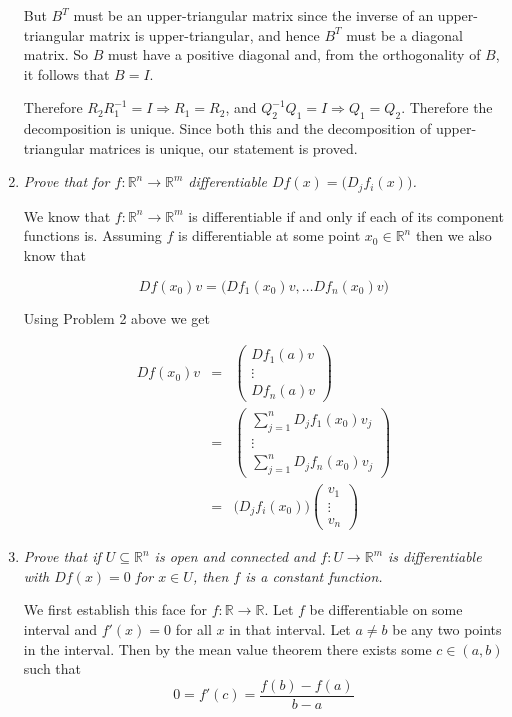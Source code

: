 \documentclass[11pt]{article}
\begin{document}
\begin{enumerate}
But $B^T$ must be an upper-triangular matrix since the inverse of an upper-triangular matrix is upper-triangular, and hence $B^T$ must be a diagonal matrix.  So $B$ must have a positive diagonal and, from the orthogonality of $B$, it follows that $B = I$.

Therefore $R_2R_1^{-1} = I \Rightarrow R_1 = R_2$, and $Q_2^{-1}Q_1 = I \Rightarrow Q_1 = Q_2$.  Therefore the decomposition is unique.  Since both this and the decomposition of upper-triangular matrices is unique, our statement is proved.

\item \emph{Prove that for $f: \mathbb{R}^n \rightarrow \mathbb{R}^m$ differentiable $Df(x) = \big(D_jf_i(x)\big)$.}

We know that $f: \mathbb{R}^n \rightarrow \mathbb{R}^m$ is differentiable if and only if each of its component functions is.  Assuming $f$ is differentiable at some point $x_0 \in \mathbb{R}^n$ then we also know that

\[
Df(x_0)v = \big(Df_1(x_0)v, \ldots Df_n(x_0)v \big)
\]

Using Problem 2 above we get

\begin{eqnarray*}
Df(x_0)v &=& \left(\begin{array}{c} Df_1(a)v \\ \vdots \\ Df_n(a)v \end{array} \right) \\
&=& \left(\begin{array}{c} \sum_{j=1}^nD_jf_1(x_0)v_j \\ \vdots \\ \sum_{j=1}^nD_jf_n(x_0)v_j \end{array} \right) \\
&=& \big(D_jf_i(x_0)\big)\left(\begin{array}{c} v_1 \\ \vdots \\ v_n \end{array} \right)
\end{eqnarray*}

\item \emph{Prove that if $U \subseteq \mathbb{R}^n$ is open and connected and $f: U \rightarrow \mathbb{R}^m$ is differentiable with $Df(x) = 0$ for $x \in U$, then $f$ is a constant function.}

We first establish this face for $f: \mathbb{R} \rightarrow \mathbb{R}$.  Let $f$ be differentiable on some interval and $f'(x) = 0$ for all $x$ in that interval.  Let $a \neq b$ be any two points in the interval.  Then by the mean value theorem there exists some $c \in (a,b)$ such that
\[
0 = f'(c) = \frac{f(b)-f(a)}{b-a}
\]


\end{enumerate}
\end{document}
